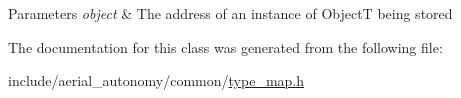 \begin{DoxyParams}{Parameters}
{\em object} & The address of an instance of Object\-T being stored \\
\hline
\end{DoxyParams}


The documentation for this class was generated from the following file\-:\begin{DoxyCompactItemize}
\item 
include/aerial\-\_\-autonomy/common/\hyperlink{type__map_8h}{type\-\_\-map.\-h}\end{DoxyCompactItemize}
